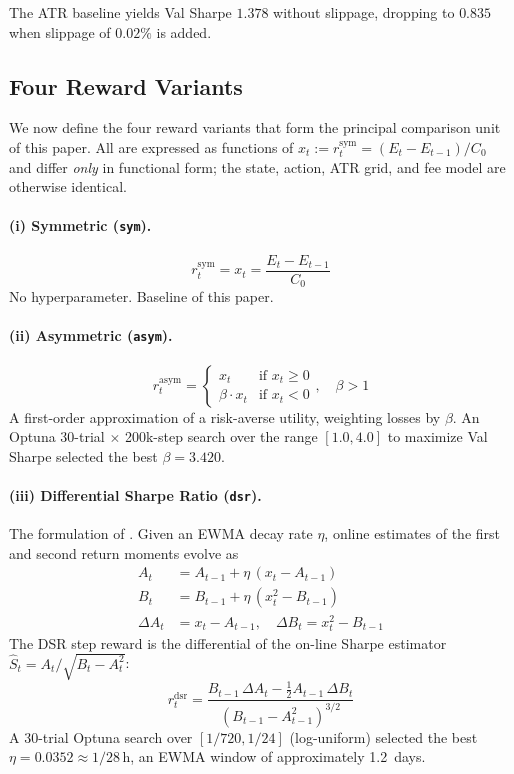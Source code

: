 \documentclass[11pt, a4paper]{article}
\begin{document}
The ATR baseline yields Val Sharpe $1.378$ without slippage, dropping to
$0.835$ when slippage of $0.02\%$ is added.

\subsection{Four Reward Variants}
\label{sec:reward_variants}

We now define the four reward variants that form the principal comparison unit
of this paper. All are expressed as functions of $x_t := r_t^{\mathrm{sym}} =
(E_t - E_{t-1}) / C_0$ and differ \emph{only} in functional form; the state,
action, ATR grid, and fee model are otherwise identical.

\paragraph{(i) Symmetric (\texttt{sym}).}
\begin{equation}
r_t^{\mathrm{sym}} = x_t = \frac{E_t - E_{t-1}}{C_0}
\end{equation}
No hyperparameter. Baseline of this paper.

\paragraph{(ii) Asymmetric (\texttt{asym}).}
\begin{equation}
r_t^{\mathrm{asym}} =
\begin{cases}
x_t & \text{if } x_t \geq 0 \\
\beta \cdot x_t & \text{if } x_t < 0
\end{cases}, \quad \beta > 1
\end{equation}
A first-order approximation of a risk-averse utility, weighting losses by
$\beta$. An Optuna 30-trial $\times$ 200k-step search over the range
$[1.0, 4.0]$ to maximize Val Sharpe selected the best $\beta = 3.420$.

\paragraph{(iii) Differential Sharpe Ratio (\texttt{dsr}).}
The formulation of \citet{moody2001dsr}. Given an EWMA decay rate $\eta$,
online estimates of the first and second return moments evolve as
\begin{align}
A_t &= A_{t-1} + \eta \, (x_t - A_{t-1}) \\
B_t &= B_{t-1} + \eta \, (x_t^2 - B_{t-1}) \\
\Delta A_t &= x_t - A_{t-1}, \quad \Delta B_t = x_t^2 - B_{t-1}
\end{align}
The DSR step reward is the differential of the on-line Sharpe estimator
$\hat{S}_t = A_t / \sqrt{B_t - A_t^2}$:
\begin{equation}
r_t^{\mathrm{dsr}} =
\frac{B_{t-1} \, \Delta A_t - \tfrac{1}{2} A_{t-1} \, \Delta B_t}
     {(B_{t-1} - A_{t-1}^2)^{3/2}}
\end{equation}
A 30-trial Optuna search over $[1/720, 1/24]$ (log-uniform) selected the best
$\eta = 0.0352 \approx 1/28\,\text{h}$, an EWMA window of approximately
1.2~days.
\end{document}
